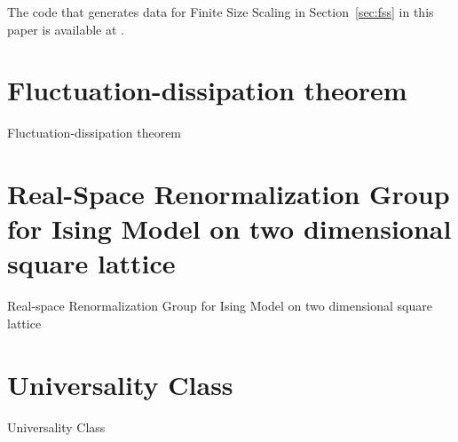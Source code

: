 \documentclass[%
 reprint,
 amsmath,amssymb,
 aps,
]{revtex4-2}
\begin{document}
\begin{acknowledgments}
The code that generates data for Finite Size Scaling in Section~\ref{sec:fss} in this paper
is available at .
\end{acknowledgments}

\appendix

\section{\label{appx:fluc}Fluctuation-dissipation theorem}
Fluctuation-dissipation theorem

\section{\label{appx:rsrg-ising}Real-Space Renormalization Group for Ising Model on 
two dimensional square lattice}
Real-space Renormalization Group for Ising Model on two dimensional square lattice

\section{\label{appx:universal}Universality Class}
Universality Class


% 
\end{document}
